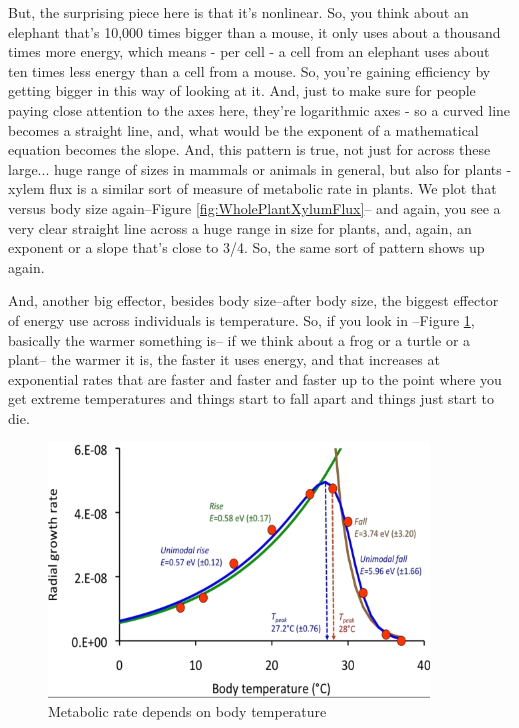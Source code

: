 \documentclass[]{article}
\begin{document}
But, the surprising piece here
is that it's nonlinear.
So, you think about an elephant
that's 10,000 times bigger than a mouse,
it only uses about
a thousand times more energy,
which means - per cell -
a cell from an elephant
uses about ten times less energy
than a cell from a mouse.
So, you're gaining efficiency
by getting bigger
in this way of looking at it.
And, just to make sure for people
paying close attention to the axes here,
they're logarithmic axes -
so a curved line becomes a straight line,
and, what would be the exponent
of a mathematical equation
becomes the slope.
And, this pattern is true,
not just for across these large...
huge range of sizes
in mammals or animals in general,
but also for plants -
xylem flux is a similar sort of measure
of metabolic rate in plants.
We plot that versus body size again--Figure \ref{fig:WholePlantXylumFlux}--
and again, you see
a very clear straight line
across a huge range in size for plants,
and, again,
an exponent or a slope
that's close to 3/4.
So, the same sort of pattern
shows up again.

And, another big effector,
besides body size--after body size,
the biggest effector of energy use
across individuals is temperature.
So, if you look in --Figure \ref{fig:BodyTemperature},
basically the warmer something is--
if we think about a frog
or a turtle or a plant--
the warmer it is,
the faster it uses energy,
and that increases at exponential rates
that are faster and faster and faster
up to the point where
you get extreme temperatures
and things start to fall apart
and things just start to die.

\begin{figure}[H]
	\caption[Metabolic rate depends on body temperature]{Metabolic rate depends on body temperature\cite{dell2011systematic}}\label{fig:BodyTemperature}
	\includegraphics[width=0.9\textwidth]{BodyTemperature}
\end{figure}
\end{document}
